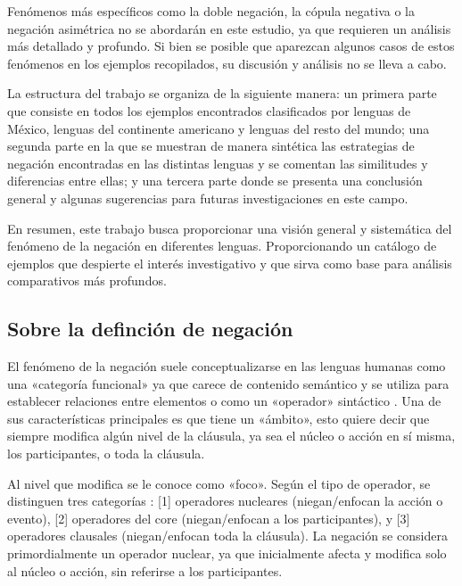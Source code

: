 Fenómenos más específicos como la doble negación, la cópula negativa o la negación asimétrica no se abordarán en este estudio, ya que requieren un análisis más detallado y profundo. Si bien se posible que aparezcan algunos casos de estos fenómenos en los ejemplos recopilados, su discusión y análisis no se lleva a cabo.

La estructura del trabajo se organiza de la siguiente manera: un primera parte que consiste en todos los ejemplos encontrados clasificados por lenguas de México, lenguas del continente americano y lenguas del resto del mundo; una segunda parte en la que se muestran de manera sintética las estrategias de negación encontradas en las distintas lenguas y se comentan las similitudes y diferencias entre ellas; y una tercera parte donde se presenta una conclusión general y algunas sugerencias para futuras investigaciones en este campo.

En resumen, este trabajo busca proporcionar una visión general y sistemática del fenómeno de la negación en diferentes lenguas. Proporcionando un catálogo de ejemplos que despierte el interés investigativo y que sirva como base para análisis comparativos más profundos.

\subsection*{Sobre la definción de negación}

\noindent El fenómeno de la negación suele conceptualizarse en las lenguas humanas como una «categoría funcional» ya que carece de contenido semántico y se utiliza para establecer relaciones entre elementos o como un «operador» sintáctico \textcolor{MidnightBlue}{\citep{lawler,CasasNavarro2005}}. Una de sus características principales es que tiene un «ámbito», esto quiere decir que siempre modifica algún nivel de la cláusula, ya sea el núcleo o acción en sí misma, los participantes, o toda la cláusula.

Al nivel que modifica se le conoce como «foco». Según el tipo de operador, se distinguen tres categorías \textcolor{MidnightBlue}{\citep{Valin}}: [1] operadores nucleares (niegan/enfocan la acción o evento), [2] operadores del core (niegan/enfocan a los participantes), y [3] operadores clausales (niegan/enfocan toda la cláusula). La negación se considera primordialmente un operador nuclear, ya que inicialmente afecta y modifica solo al núcleo o acción, sin referirse a los participantes.

